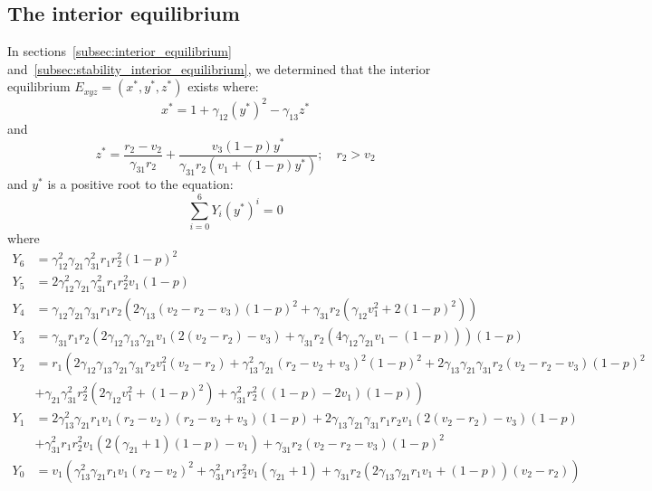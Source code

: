 \subsection{The interior equilibrium}\label{subsec:numsim_interior_equilibrium}
In sections~\ref{subsec:interior_equilibrium} and~\ref{subsec:stability_interior_equilibrium}, we determined that the interior equilibrium $E_{xyz}=\left(x^*,y^*,z^*\right)$ exists where:
\[
x^*=1+\gamma_{12}\left(y^*\right)^2-\gamma_{13}z^*
\]
and
\[
z^*=\frac{r_2-v_2}{\gamma_{31}r_2}+\frac{v_3\left(1-p\right)y^*}{\gamma_{31}r_2\left(v_1+\left(1-p\right)y^*\right)};\quad r_2>v_2
\]
and $y^*$ is a positive root to the equation:
\begin{equation*}
    \sum_{i=0}^6 Y_i\left(y^*\right)^i=0
\end{equation*}
where
\begin{align*}
    Y_6 &= \gamma_{12}^2\gamma_{21}\gamma_{31}^2r_1r_2^2\left(1-p\right)^2\\
    Y_5 &= 2\gamma_{12}^2\gamma_{21}\gamma_{31}^2r_1r_2^2v_1\left(1-p\right)\\
    Y_4 &= \gamma_{12}\gamma_{21}\gamma_{31}r_1r_2\left(2\gamma_{13}\left(v_2-r_2-v_3\right)\left(1-p\right)^2+\gamma_{31}r_2\left(\gamma_{12}v_1^2+2\left(1-p\right)^2\right)\right)\\
    Y_3 &= \gamma_{31}r_1r_2\left(2\gamma_{12}\gamma_{13}\gamma_{21}v_1\left(2\left(v_2-r_2\right)-v_3\right)+\gamma_{31}r_2\left(4\gamma_{12}\gamma_{21}v_1-\left(1-p\right)\right)\right)\left(1-p\right)\\
    Y_2 &= r_1\left(2\gamma_{12}\gamma_{13}\gamma_{21}\gamma_{31}r_2v_1^2\left(v_2-r_2\right)+\gamma_{13}^2\gamma_{21}\left(r_2-v_2+v_3\right)^2\left(1-p\right)^2+2\gamma_{13}\gamma_{21}\gamma_{31}r_2\left(v_2-r_2-v_3\right)\left(1-p\right)^2\right.\\
    &\left.+\gamma_{21}\gamma_{31}^2r_2^2\left(2\gamma_{12}v_1^2+\left(1-p\right)^2\right)+\gamma_{31}^2r_2^2\left(\left(1-p\right)-2v_1\right)\left(1-p\right)\right)\\
    Y_1 &= 2\gamma_{13}^2\gamma_{21}r_1v_1\left(r_2-v_2\right)\left(r_2-v_2+v_3\right)\left(1-p\right)+2\gamma_{13}\gamma_{21}\gamma_{31}r_1r_2v_1\left(2\left(v_2-r_2\right)-v_3\right)\left(1-p\right)\\
    &+\gamma_{31}^2r_1r_2^2v_1\left(2\left(\gamma_{21}+1\right)\left(1-p\right)-v_1\right)+\gamma_{31}r_2\left(v_2-r_2-v_3\right)\left(1-p\right)^2\\
    Y_0 &= v_1\left(\gamma_{13}^2\gamma_{21}r_1v_1\left(r_2-v_2\right)^2+\gamma_{31}^2r_1r_2^2v_1\left(\gamma_{21}+1\right)+\gamma_{31}r_2\left(2\gamma_{13}\gamma_{21}r_1v_1+\left(1-p\right)\right)\left(v_2-r_2\right)\right)
\end{align*}
